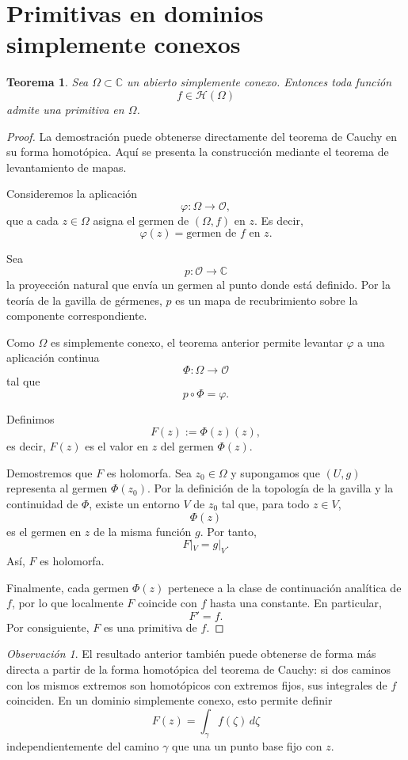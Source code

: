 \documentclass[11pt,a4paper]{article}
\theoremstyle{definition}
\theoremstyle{plain}
\newtheorem{teorema}{Teorema}[section]
\theoremstyle{remark}
\newtheorem{observacion}{Observación}[section]
\newcommand{\C}{\mathbb C}
\newcommand{\Hol}{\mathcal H}
\begin{document}
\section{Primitivas en dominios simplemente conexos}

\begin{teorema}
Sea $\Omega\subset\C$ un abierto simplemente conexo. Entonces toda
función
\[
f\in\Hol(\Omega)
\]
admite una primitiva en $\Omega$.
\end{teorema}

\begin{proof}
La demostración puede obtenerse directamente del teorema de Cauchy en
su forma homotópica. Aquí se presenta la construcción mediante el
teorema de levantamiento de mapas.

Consideremos la aplicación
\[
\varphi:\Omega\longrightarrow\mathcal O,
\]
que a cada $z\in\Omega$ asigna el germen de $(\Omega,f)$ en $z$.
Es decir,
\[
\varphi(z)=\text{germen de }f\text{ en }z.
\]

Sea
\[
p:\mathcal O\longrightarrow\C
\]
la proyección natural que envía un germen al punto donde está definido.
Por la teoría de la gavilla de gérmenes, $p$ es un mapa de recubrimiento
sobre la componente correspondiente.

Como $\Omega$ es simplemente conexo, el teorema anterior permite
levantar $\varphi$ a una aplicación continua
\[
\Phi:\Omega\longrightarrow\mathcal O
\]
tal que
\[
p\circ\Phi=\varphi.
\]

Definimos
\[
F(z):=\Phi(z)(z),
\]
es decir, $F(z)$ es el valor en $z$ del germen $\Phi(z)$.

Demostremos que $F$ es holomorfa. Sea $z_0\in\Omega$ y supongamos que
$(U,g)$ representa al germen $\Phi(z_0)$. Por la definición de la
topología de la gavilla y la continuidad de $\Phi$, existe un entorno
$V$ de $z_0$ tal que, para todo $z\in V$,
\[
\Phi(z)
\]
es el germen en $z$ de la misma función $g$. Por tanto,
\[
F|_V=g|_V.
\]
Así, $F$ es holomorfa.

Finalmente, cada germen $\Phi(z)$ pertenece a la clase de continuación
analítica de $f$, por lo que localmente $F$ coincide con $f$ hasta una
constante. En particular,
\[
F'=f.
\]
Por consiguiente, $F$ es una primitiva de $f$.
\end{proof}

\begin{observacion}
El resultado anterior también puede obtenerse de forma más directa a
partir de la forma homotópica del teorema de Cauchy: si dos caminos con
los mismos extremos son homotópicos con extremos fijos, sus integrales
de $f$ coinciden. En un dominio simplemente conexo, esto permite definir
\[
F(z)=\int_{\gamma}f(\zeta)\,d\zeta
\]
independientemente del camino $\gamma$ que una un punto base fijo con
$z$.
\end{observacion}
\end{document}
